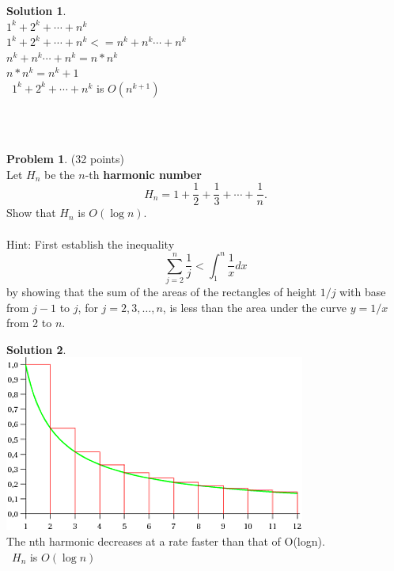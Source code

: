 \documentclass{article}
\theoremstyle{definition}
\newtheorem{problem}{Problem}
\newtheorem*{solution}{Solution}
\begin{document}
\begin{solution}\ \\
$1^k + 2^k + \cdots + n^k$\ \\
$1^k + 2^k + \cdots + n^k <= n^k + n^k \cdots +n^k $\ \\
$n^k + n^k \cdots +n^k = n*n^k$\ \\
$n*n^k = n^k+1$\ \\
\therefore \ $1^k + 2^k + \cdots + n^k$ is $O(n^{k+1})$
\end{solution}

\newpage
\ \\ \ \\
\begin{problem} (32 points)\\
Let $H_n$ be the $n$-th \textbf{harmonic number}
$$H_n = 1 + \frac{1}{2} + \frac{1}{3} + \cdots + \frac{1}{n}.$$
Show that $H_n$ is $O(\log n)$.
\ \\
\ \\
Hint: First establish the inequality $$\sum_{j=2}^n \frac{1}{j} < \int_1^n \frac{1}{x}dx$$ by showing that the sum of the areas of the rectangles of height $1/j$ with base from $j-1$ to $j$, for $j=2,3,\ldots,n$, is less than the area under the curve $y=1/x$ from 2 to $n$.
\end{problem}
\begin{solution}\ \\
\includegraphics[width=\textwidth ,height=\textheight,keepaspectratio]{SpHUQ.png}\ \\
The nth harmonic decreases at a rate faster than that of O(logn).\ \\
\therefore \ $H_n$ is $O(\log n)$
\end{solution}
\end{document}
